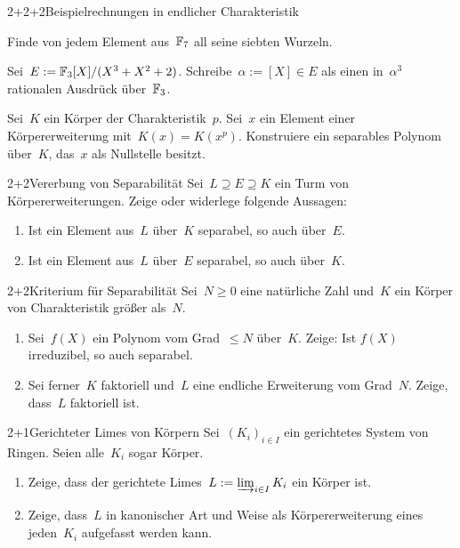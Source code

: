 \documentclass{algblatt}
\begin{document}

\begin{aufgabeE}{2+2+2}{Beispielrechnungen in endlicher Charakteristik}
\item Finde von jedem Element aus~$\mathbb{F}_7$ all seine siebten Wurzeln.
\item Sei~$E := \mathbb{F}_3[X]/(X^3 + X^2 + 2)$. Schreibe~$\alpha := [X] \in E$ als einen
in~$\alpha^3$ rationalen Ausdrück über~$\mathbb{F}_3$.
\item Sei~$K$ ein Körper der Charakteristik~$p$. Sei~$x$ ein Element einer
Körpererweiterung mit~$K(x) = K(x^p)$. Konstruiere ein separables Polynom
über~$K$, das~$x$ als Nullstelle besitzt.
\end{aufgabeE}

\begin{aufgabe}{2+2}{Vererbung von Separabilität}
Sei~$L \supseteq E \supseteq K$ ein Turm von Körpererweiterungen. Zeige oder
widerlege folgende Aussagen:
\begin{enumerate}
\item Ist ein Element aus~$L$ über~$K$ separabel, so auch über~$E$.
\item Ist ein Element aus~$L$ über~$E$ separabel, so auch über~$K$.
\end{enumerate}
\end{aufgabe}

\begin{aufgabe}{2+2}{Kriterium für Separabilität}
Sei~$N \geq 0$ eine natürliche Zahl und~$K$ ein Körper von Charakteristik
größer als~$N$.
\begin{enumerate}
\item Sei~$f(X)$ ein Polynom vom Grad~$\leq N$ über~$K$. Zeige:
Ist $f(X)$ irreduzibel, so auch separabel.
\item Sei ferner~$K$ faktoriell und~$L$ eine endliche Erweiterung vom Grad~$N$.
Zeige, dass~$L$ faktoriell ist.
\end{enumerate}
\end{aufgabe}

\begin{aufgabe}{2+1}{Gerichteter Limes von Körpern}
Sei~$(K_i)_{i \in I}$ ein gerichtetes System von Ringen. Seien alle~$K_i$ sogar
Körper.
\begin{enumerate}
\item Zeige, dass der gerichtete Limes~$L := \varinjlim_{i \in I} K_i$ ein
Körper ist.
\item Zeige, dass~$L$ in kanonischer Art und Weise als Körpererweiterung eines
jeden~$K_i$ aufgefasst werden kann.
\end{enumerate}
\end{aufgabe}
\end{document}
